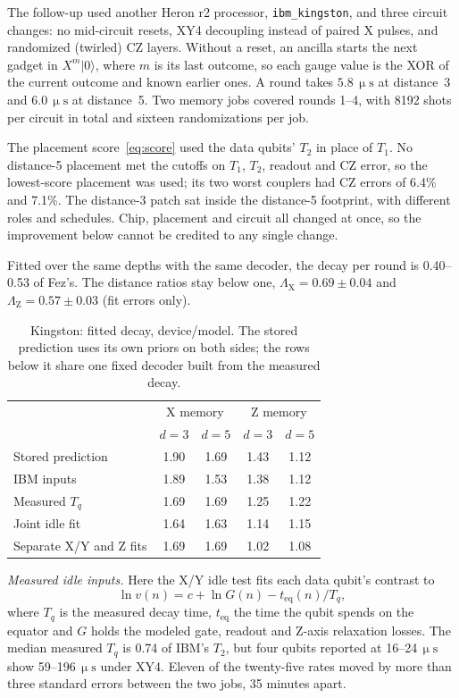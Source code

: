 \documentclass[aps,pra,reprint,nofootinbib,longbibliography,floatfix]{revtex4-2}
\newcommand{\ket}[1]{\lvert #1\rangle}
\newcommand{\us}{\,\upmu\mathrm{s}}
\newcommand{\LX}{\Lambda_{\mathrm{X}}}
\newcommand{\LZ}{\Lambda_{\mathrm{Z}}}
\begin{document}
The follow-up used another Heron r2 processor, \texttt{ibm\_kingston}, and three circuit changes: no mid-circuit resets, XY4 decoupling instead of paired X pulses, and randomized (twirled) CZ layers.
Without a reset, an ancilla starts the next gadget in $X^m\ket{0}$, where $m$ is its last outcome, so each gauge value is the XOR of the current outcome and known earlier ones.
A round takes $5.8\us$ at distance~3 and $6.0\us$ at distance~5.
Two memory jobs covered rounds 1--4, with 8192 shots per circuit in total and sixteen randomizations per job.

The placement score~\eqref{eq:score} used the data qubits' $T_2$ in place of $T_1$.
No distance-5 placement met the cutoffs on $T_1$, $T_2$, readout and CZ error, so the lowest-score placement was used; its two worst couplers had CZ errors of 6.4\% and 7.1\%.
The distance-3 patch sat inside the distance-5 footprint, with different roles and schedules.
Chip, placement and circuit all changed at once, so the improvement below cannot be credited to any single change.

Fitted over the same depths with the same decoder, the decay per round is 0.40--0.53 of Fez's.
The distance ratios stay below one, $\LX = 0.69 \pm 0.04$ and $\LZ = 0.57 \pm 0.03$ (fit errors only).

\begin{table}[b]
\caption{Kingston: fitted decay, device/model. The stored prediction uses its own priors on both sides; the rows below it share one fixed decoder built from the measured decay.}
\label{tab:kingston}
\begin{ruledtabular}
\begin{tabular}{lcccc}
 & \multicolumn{2}{c}{X memory} & \multicolumn{2}{c}{Z memory}\\
 & $d=3$ & $d=5$ & $d=3$ & $d=5$ \\
\hline
Stored prediction & 1.90 & 1.69 & 1.43 & 1.12 \\
\hline
IBM inputs & 1.89 & 1.53 & 1.38 & 1.12 \\
Measured $T_q$ & 1.69 & 1.69 & 1.25 & 1.22 \\
Joint idle fit & 1.64 & 1.63 & 1.14 & 1.15 \\
Separate X/Y and Z fits & 1.69 & 1.69 & 1.02 & 1.08 \\
\end{tabular}
\end{ruledtabular}
\end{table}

\textit{Measured idle inputs.}
Here the X/Y idle test fits each data qubit's contrast to
\begin{equation}
\ln v(n) = c + \ln G(n) - t_{\mathrm{eq}}(n)/T_q,
\label{eq:tq}
\end{equation}
where $T_q$ is the measured decay time, $t_{\mathrm{eq}}$ the time the qubit spends on the equator and $G$ holds the modeled gate, readout and Z-axis relaxation losses.
The median measured $T_q$ is 0.74 of IBM's $T_2$, but four qubits reported at 16--24$\us$ show 59--196$\us$ under XY4.
Eleven of the twenty-five rates moved by more than three standard errors between the two jobs, 35 minutes apart.
\end{document}
